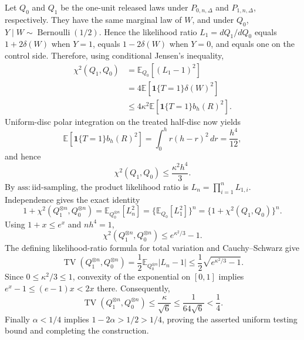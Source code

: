 Let \(Q_0\) and \(Q_1\) be the one-unit released laws under \(P_{0,n,\Delta}\) and \(P_{1,n,\Delta}\), respectively.  They have the same marginal law of \(W\), and under \(Q_0\), \(Y\mid W\sim\operatorname{Bernoulli}(1/2)\).  Hence the likelihood ratio \(L_1=dQ_1/dQ_0\) equals \(1+2\delta(W)\) when \(Y=1\), equals \(1-2\delta(W)\) when \(Y=0\), and equals one on the control side.  Therefore, using conditional Jensen's inequality,
\[
 \begin{aligned}
 \chi^2(Q_1,Q_0)
 &=\mathbb E_{Q_0}[(L_1-1)^2]\\
 &=4\mathbb E[\mathbf1\{T=1\}\delta(W)^2]\\
 &\le4\kappa^2\mathbb E[\mathbf1\{T=1\}b_h(R)^2].
 \end{aligned}
\]
Uniform-disc polar integration on the treated half-disc now yields
\[
 \mathbb E[\mathbf1\{T=1\}b_h(R)^2]
 =\int_0^h r(h-r)^2\,dr
 =\frac{h^4}{12},
\]
and hence
\[
 \chi^2(Q_1,Q_0)\le\frac{\kappa^2h^4}{3}.
\]
By \(\mathrm{ass:iid\text{-}sampling}\), the product likelihood ratio is \(L_n=\prod_{i=1}^nL_{1,i}\).  Independence gives the exact identity
\[
 1+\chi^2(Q_1^{\otimes n},Q_0^{\otimes n})
 =\mathbb E_{Q_0^{\otimes n}}[L_n^2]
 =\{\mathbb E_{Q_0}[L_1^2]\}^n
 =\{1+\chi^2(Q_1,Q_0)\}^n.
\]
Using \(1+x\le e^x\) and \(nh^4=1\),
\[
 \chi^2(Q_1^{\otimes n},Q_0^{\otimes n})
 \le e^{\kappa^2/3}-1.
\]
The defining likelihood-ratio formula for total variation and Cauchy--Schwarz give
\[
 \operatorname{TV}(Q_1^{\otimes n},Q_0^{\otimes n})
 =\frac12\mathbb E_{Q_0^{\otimes n}}|L_n-1|
 \le\frac12\sqrt{e^{\kappa^2/3}-1}.
\]
Since \(0\le\kappa^2/3\le1\), convexity of the exponential on \([0,1]\) implies \(e^x-1\le(e-1)x<2x\) there.  Consequently,
\[
 \operatorname{TV}(Q_1^{\otimes n},Q_0^{\otimes n})
 \le\frac{\kappa}{\sqrt6}
 \le\frac{1}{64\sqrt6}
 <\frac14.
\]
Finally \(\alpha<1/4\) implies \(1-2\alpha>1/2>1/4\), proving the asserted uniform testing bound and completing the construction.